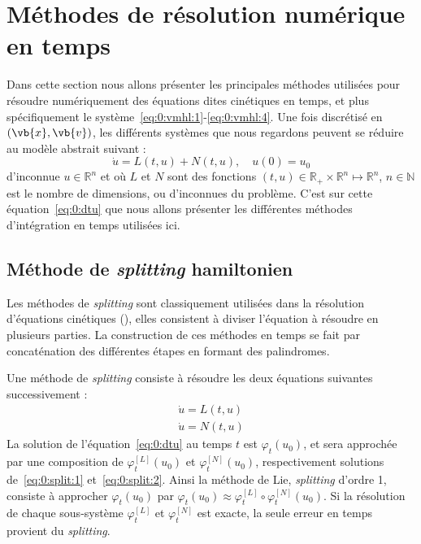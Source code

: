 
\section{Méthodes de résolution numérique en temps}

Dans cette section nous allons présenter les principales méthodes utilisées pour résoudre numériquement des équations dites cinétiques en temps, et plus spécifiquement le système~\eqref{eq:0:vmhl:1}-\eqref{eq:0:vmhl:4}. Une fois discrétisé en $(\vb{x},\vb{v})$, les différents systèmes que nous regardons peuvent se réduire au modèle abstrait suivant :
\begin{equation}
  \dot{u} = L(t,u) + N(t,u),\quad u(0)=u_0
  \label{eq:0:dtu}
\end{equation}
d'inconnue $u\in\mathbb{R}^n$ et où $L$ et $N$ sont des fonctions $(t,u)\in\mathbb{R}_+\times\mathbb{R}^n\mapsto\mathbb{R}^n$, $n\in\mathbb{N}$ est le nombre de dimensions, ou d'inconnues du problème. C'est sur cette équation~\eqref{eq:0:dtu} que nous allons présenter les différentes méthodes d'intégration en temps utilisées ici.

\subsection{Méthode de \emph{splitting} hamiltonien}

Les méthodes de \emph{splitting} sont classiquement utilisées dans la résolution d'équations cinétiques (\cite{Morrison:2017,Grandgirard:2006,Tronci:2010,Tronci:2014}), elles consistent à diviser l'équation à résoudre en plusieurs parties. La construction de ces méthodes en temps se fait par concaténation des différentes étapes en formant des palindromes.

Une méthode de \emph{splitting} consiste à résoudre les deux équations suivantes successivement :
\begin{eqnarray}
    \dot{u} = L(t,u)\label{eq:0:split:1}\\
    \dot{u} = N(t,u)\label{eq:0:split:2}
\end{eqnarray}
La solution de l'équation~\eqref{eq:0:dtu} au temps $t$ est $\varphi_t(u_0)$, et sera approchée par une composition de $\varphi_t^{[L]}(u_0)$ et $\varphi_t^{[N]}(u_0)$, respectivement solutions de~\eqref{eq:0:split:1} et~\eqref{eq:0:split:2}. Ainsi la méthode de Lie, \emph{splitting} d'ordre 1, consiste à approcher $\varphi_t(u_0)$ par $\varphi_t(u_0)\approx \varphi_t^{[L]} \circ \varphi_t^{[N]}(u_0)$. Si la résolution de chaque sous-système $\varphi_t^{[L]}$ et $\varphi_t^{[N]}$ est exacte, la seule erreur en temps provient du \emph{splitting}.

